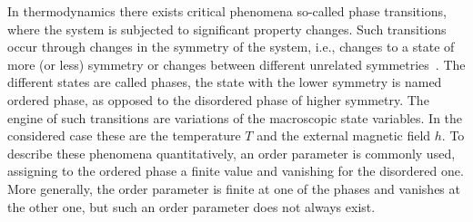 In thermodynamics there exists critical phenomena so-called phase transitions, where the system is subjected to significant property changes. Such 
transitions occur through changes in the symmetry of the system, i.e., changes to a state of more (or less) symmetry or changes between different unrelated 
symmetries~\cite{Landau1976}. The different states are called phases, the state with the lower symmetry is named ordered phase, as opposed to the 
disordered phase of higher symmetry. The engine of such transitions are variations of the macroscopic state variables. In the considered case 
these are the temperature $T$ and the external magnetic field $h$. To describe these phenomena quantitatively, an order parameter is commonly used, 
assigning to the ordered phase a finite value and vanishing for the disordered one. More generally, the order parameter is finite at one of the phases 
and vanishes at the other one, but such an order parameter does not always exist.~\cite{Landau1976,Schwabl2000}


